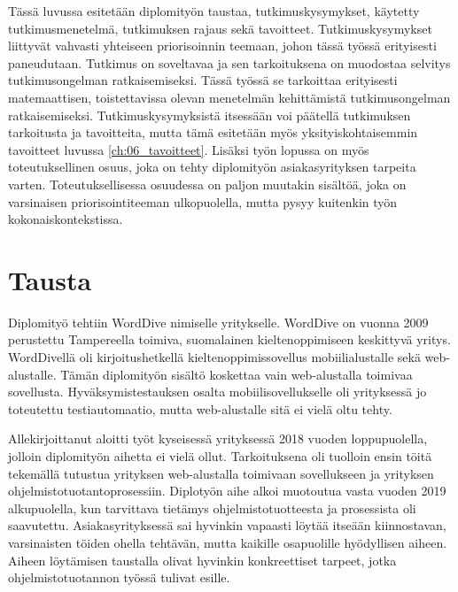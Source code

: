 Tässä luvussa esitetään diplomityön taustaa, tutkimuskysymykset, käytetty tutkimusmenetelmä, tutkimuksen rajaus sekä tavoitteet.
Tutkimuskysymykset liittyvät vahvasti yhteiseen priorisoinnin teemaan, johon tässä työssä erityisesti paneudutaan.
Tutkimus on soveltavaa ja sen tarkoituksena on muodostaa selvitys tutkimusongelman ratkaisemiseksi.
Tässä työssä se tarkoittaa erityisesti matemaattisen, toistettavissa olevan menetelmän kehittämistä tutkimusongelman ratkaisemiseksi.
Tutkimuskysymyksistä itsessään voi päätellä tutkimuksen tarkoitusta ja tavoitteita, mutta tämä esitetään myös yksityiskohtaisemmin tavoitteet luvussa \ref{ch:06_tavoitteet}.
Lisäksi työn lopussa on myös toteutuksellinen osuus, joka on tehty diplomityön asiakasyrityksen tarpeita varten.
Toteutuksellisessa osuudessa on paljon muutakin sisältöä, joka on varsinaisen priorisointiteeman ulkopuolella, mutta pysyy kuitenkin työn kokonaiskontekstissa.

\section{Tausta} \label{ch:06_tausta}

Diplomityö tehtiin WordDive nimiselle yritykselle. WordDive on vuonna 2009 perustettu Tampereella toimiva, suomalainen kieltenoppimiseen keskittyvä yritys. WordDivellä oli kirjoitushetkellä kieltenoppimissovellus mobiilialustalle sekä web-alustalle.
Tämän diplomityön sisältö koskettaa vain web-alustalla toimivaa sovellusta.
Hyväksymistestauksen osalta mobiilisovellukselle oli yrityksessä jo toteutettu testiautomaatio, mutta web-alustalle sitä ei vielä oltu tehty.

Allekirjoittanut aloitti työt kyseisessä yrityksessä 2018 vuoden loppupuolella, jolloin diplomityön aihetta ei vielä ollut.
Tarkoituksena oli tuolloin ensin töitä tekemällä tutustua yrityksen web-alustalla toimivaan sovellukseen ja yrityksen ohjelmistotuotantoprosessiin.
Diplotyön aihe alkoi muotoutua vasta vuoden 2019 alkupuolella, kun tarvittava tietämys ohjelmistotuotteesta ja prosessista oli saavutettu.
Asiakasyrityksessä sai hyvinkin vapaasti löytää itseään kiinnostavan, varsinaisten töiden ohella tehtävän, mutta kaikille osapuolille hyödyllisen aiheen.
Aiheen löytämisen taustalla olivat hyvinkin konkreettiset tarpeet, jotka ohjelmistotuotannon työssä tulivat esille.


